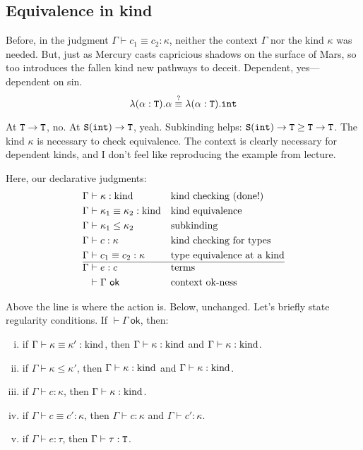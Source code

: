 \subsection{Equivalence in kind}
Before, in the judgment $\Gamma \vdash c_1 \equiv c_2 : \kappa$, neither the context
$\Gamma$ nor the kind $\kappa$ was needed. But, just as Mercury
casts capricious shadows on the surface of Mars, so too introduces the fallen
kind new pathways to deceit. Dependent, yes---dependent on sin.
\[\lambda(\alpha : \textnormal{\texttt{T}}).\alpha \stackrel{?}{\equiv} \lambda(\alpha:\textnormal{\texttt{T}}).\textnormal{\texttt{int}}\]

At $\textnormal{\texttt{T}} \to \textnormal{\texttt{T}}$, no. At $\textnormal{\texttt{S}}(\textnormal{\texttt{int}}) \to \textnormal{\texttt{T}}$, yeah. Subkinding helps:
$\textnormal{\texttt{S}}(\textnormal{\texttt{int}}) \to \textnormal{\texttt{T}} \ge \textnormal{\texttt{T}} \to \textnormal{\texttt{T}}$. The kind $\kappa$ is necessary to check
equivalence. The context is clearly necessary for dependent
kinds, and I don't feel like reproducing the example from lecture.

Here, our declarative judgments:
\begin{align*}
  \Gamma &\vdash \kappa : \textnormal{kind} &&\text{kind checking (done!)}\\
  \Gamma &\vdash \kappa_1 \equiv \kappa_2 : \textnormal{kind} &&\text{kind equivalence}\\
  \Gamma &\vdash \kappa_1 \le \kappa_2 &&\text{subkinding}\\
  \Gamma &\vdash c : \kappa &&\text{kind checking for types}\\
  \Gamma &\vdash c_1 \equiv c_2 : \kappa &&\text{type equivalence at a kind}\\
  \hline
  \Gamma &\vdash e : c &&\text{terms}\\
  &\vdash \Gamma~\mathsf{ok} &&\text{context ok-ness}
\end{align*}

Above the line is where the action is. Below, unchanged.
Let's briefly state regularity conditions. If $\vdash \Gamma~\mathsf{ok}$, then:
\begin{enumerate}[(i)]
  \item if $\Gamma \vdash \kappa \equiv \kappa' : \textnormal{kind}$, then $\Gamma \vdash \kappa : \textnormal{kind}$
    and $\Gamma \vdash \kappa : \textnormal{kind}$.
  \item if $\Gamma \vdash \kappa \le \kappa'$, then $\Gamma \vdash \kappa : \textnormal{kind}$
    and $\Gamma \vdash \kappa : \textnormal{kind}$.
  \item if $\Gamma \vdash c : \kappa$, then $\Gamma \vdash \kappa : \textnormal{kind}$.
  \item if $\Gamma \vdash c \equiv c' : \kappa$, then $\Gamma \vdash c : \kappa$
    and $\Gamma \vdash c' : \kappa$.
  \item if $\Gamma \vdash e : \tau$, then $\Gamma \vdash \tau : \textnormal{\texttt{T}}$.
\end{enumerate}

